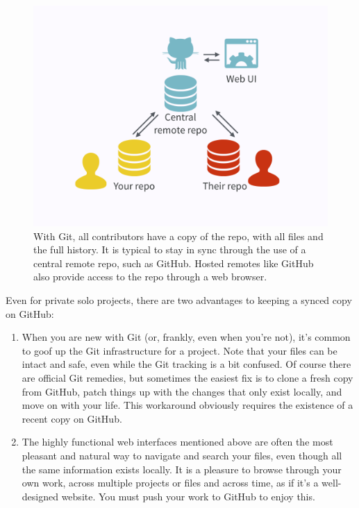 \documentclass[12pt]{article}
\begin{document}
\begin{figure}
\includegraphics[width=1\linewidth]{your-repo-their-repo-central-remote-repo} \caption{\label{fig:yours-theirs-github}With Git, all contributors have a copy of the repo, with all files and the full history. It is typical to stay in sync through the use of a central remote repo, such as GitHub. Hosted remotes like GitHub also provide access to the repo through a web browser.}\label{fig:yours-theirs-github}
\end{figure}

Even for private solo projects, there are two advantages to keeping a
synced copy on GitHub:

\begin{enumerate}
\def\labelenumi{\arabic{enumi}.}
\item
  When you are new with Git (or, frankly, even when you're not), it's
  common to goof up the Git infrastructure for a project. Note that your
  files can be intact and safe, even while the Git tracking is a bit
  confused. Of course there are official Git remedies, but sometimes the
  easiest fix is to clone a fresh copy from GitHub, patch things up with
  the changes that only exist locally, and move on with your life. This
  workaround obviously requires the existence of a recent copy on
  GitHub.
\item
  The highly functional web interfaces mentioned above are often the
  most pleasant and natural way to navigate and search your files, even
  though all the same information exists locally. It is a pleasure to
  browse through your own work, across multiple projects or files and
  across time, as if it's a well-designed website. You must push your
  work to GitHub to enjoy this.
\end{enumerate}
\end{document}

